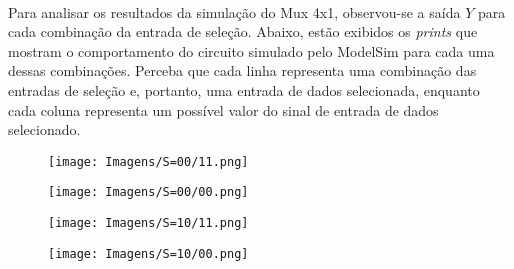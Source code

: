 \documentclass[a4paper,12pt]{article}
\begin{document}
\paragraph{}
Para analisar os resultados da simulação do Mux 4x1, observou-se a saída $Y$ para cada combinação da entrada de seleção. Abaixo, estão exibidos os \textit{prints} que mostram o comportamento do circuito simulado pelo ModelSim para cada uma dessas combinações. Perceba que cada linha representa uma combinação das entradas de seleção e, portanto, uma entrada de dados selecionada, enquanto cada coluna representa um possível valor do sinal de entrada de dados selecionado.

\begin{figure}[H]
    \centering
    \setlength{\lineskip}{0pt}
    \setlength{\baselineskip}{0pt}
    
    \begin{minipage}[t]{0.2675\textwidth}
        \centering
        \begin{tcolorbox}[colframe=cinza, colback=white, boxrule=0pt, arc=0pt, width=\textwidth, boxsep=0pt, left=0pt, right=0pt, top=0pt, bottom=0pt]
            \texttt{[image: Imagens/S=00/11.png]}
        \end{tcolorbox}
    \end{minipage}
    \hspace{0.1em}
    \begin{minipage}[t]{0.2675\textwidth}
        \centering
        \begin{tcolorbox}[colframe=cinza, colback=white, boxrule=0pt, arc=0pt, width=\textwidth, boxsep=0pt, left=0pt, right=0pt, top=0pt, bottom=0pt]
            \texttt{[image: Imagens/S=00/00.png]}
        \end{tcolorbox}
    \end{minipage}
    
    \vspace{0.25em}
    
    \begin{minipage}[t]{0.2675\textwidth}
        \centering
        \begin{tcolorbox}[colframe=cinza, colback=white, boxrule=0pt, arc=0pt, width=\textwidth, boxsep=0pt, left=0pt, right=0pt, top=0pt, bottom=0pt]
            \texttt{[image: Imagens/S=10/11.png]}
        \end{tcolorbox}
    \end{minipage}
    \hspace{0.1em}
    \begin{minipage}[t]{0.2675\textwidth}
        \centering
        \begin{tcolorbox}[colframe=cinza, colback=white, boxrule=0pt, arc=0pt, width=\textwidth, boxsep=0pt, left=0pt, right=0pt, top=0pt, bottom=0pt]
            \texttt{[image: Imagens/S=10/00.png]}
        \end{tcolorbox}
    \end{minipage}
    

\end{figure}
\end{document}
